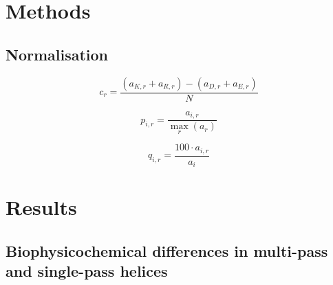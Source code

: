 \section{Methods}

\subsection{Normalisation}

\begin{equation}
c_r=\frac{(a_{K,r}+a_{R,r})-(a_{D,r}+a_{E,r})}{N}
\end{equation}


\begin{equation}
  p_{i,r}=\frac{a_{i,r}}{\underset{r}{\max}{(a_r)}}
\end{equation}

\begin{equation}
  q_{i,r}=\frac{{100}\cdot{a_{i,r}}}{a_i}
\end{equation}

\section{Results}
\subsection{Biophysicochemical differences in multi-pass and single-pass helices}
